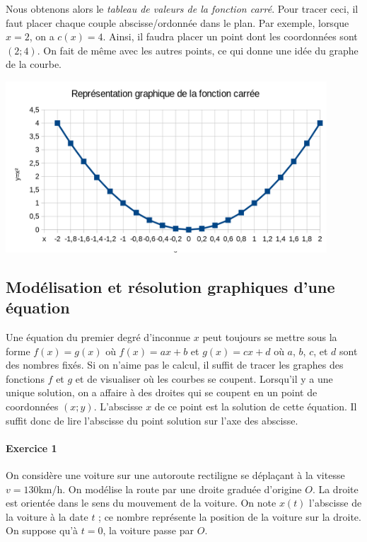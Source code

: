 			Nous obtenons alors le \emph{tableau de valeurs de la fonction carré}. Pour tracer ceci, il faut placer chaque couple abscisse/ordonnée dans le plan. Par exemple, lorsque $x=2$, on a $c(x)=4$. Ainsi, il faudra placer un point dont les coordonnées sont $(2;4)$. On fait de même avec les autres points, ce qui donne une idée du graphe de la courbe.

			\includegraphics[width=0.9\textwidth]{image/calcul/courbe_fct_car.png}

		\subsection{Modélisation et résolution graphiques d'une équation}

			Une équation du premier degré d'inconnue $x$ peut toujours se mettre sous la forme $f(x)=g(x)$ où $f(x)=ax+b$ et $g(x)=cx+d$ où $a$, $b$, $c$, et $d$ sont des nombres fixés. Si on n'aime pas le calcul, il suffit de tracer les graphes des fonctions $f$ et $g$ et de visualiser où les courbes se coupent. Lorsqu'il y a une unique solution, on a affaire à des droites qui se coupent en un point de coordonnées $(x;y)$. L'abscisse $x$ de ce point est la solution de cette équation. Il suffit donc de lire l'abscisse du point solution sur l'axe des abscisse.

			\paragraph{Exercice 1}
			On considère une voiture sur une autoroute rectiligne se déplaçant à la vitesse $v=130$km/h. On modélise la route par une droite graduée d'origine $O$. La droite est orientée dans le sens du mouvement de la voiture. On note $x(t)$ l'abscisse de la voiture à la date $t$ ; ce nombre représente la position de la voiture sur la droite. On suppose qu'à $t=0$, la voiture passe par $O$.


